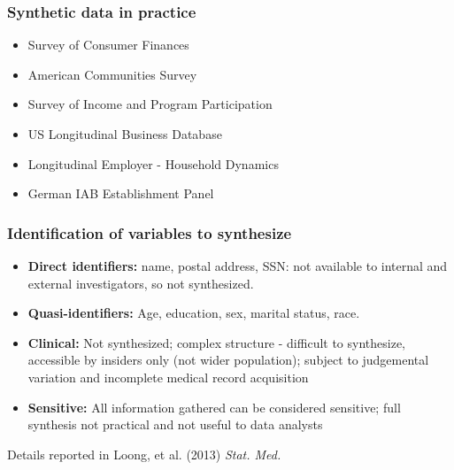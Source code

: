 \documentclass[11pt,handout]{beamer}
\begin{document}
\begin{frame}
\frametitle{Synthetic data in practice}

\begin{itemize}
\item Survey of Consumer Finances
\item American Communities Survey
\item Survey of Income and Program Participation
\item US Longitudinal Business Database
\item Longitudinal Employer - Household Dynamics
\item German IAB Establishment Panel 
\end{itemize}

\end{frame}

\begin{frame}
\frametitle{Identification of variables to synthesize}

\begin{itemize}

\item \textbf{Direct identifiers:} name, postal address, SSN: not available to internal and external investigators, so not synthesized.

  \medskip
  
\item \textbf{Quasi-identifiers:} Age, education, sex, marital status, race. 

\medskip

\item \textbf{Clinical:} Not synthesized; complex structure - difficult to synthesize, accessible by insiders only (not wider population); subject to judgemental variation and incomplete medical record acquisition

\medskip

\item \textbf{Sensitive:} All information gathered can be considered sensitive; full synthesis not practical and not useful to data analysts

\end{itemize}

Details reported in Loong, et al. (2013) \textsl{Stat. Med.}


\end{frame}
\end{document}

